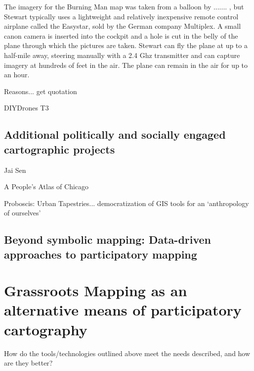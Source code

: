 \documentclass[11pt]{report}
\begin{document}
The imagery for the Burning Man map was taken from a balloon by ....... , but Stewart typically uses a lightweight and relatively inexpensive remote control airplane called the Easystar, sold by the German company Multiplex. A small canon camera is inserted into the cockpit and a hole is cut in the belly of the plane through which the pictures are taken. Stewart can fly the plane at up to a half-mile away, steering manually with a 2.4 Ghz transmitter and can capture imagery at hundreds of feet in the air. The plane can remain in the air for up to an hour. 

Reasons... get quotation

DIYDrones T3


\section{Additional politically and socially engaged cartographic projects}


Jai Sen

A People's Atlas of Chicago

Proboscis: Urban Tapestries... democratization of GIS tools for an `anthropology of ourselves'

\section{Beyond symbolic mapping: Data-driven approaches to participatory mapping}


\chapter{Grassroots Mapping as an alternative means of participatory cartography}

How do the tools/technologies outlined above meet the needs described, and how are they better?

\end{document}
